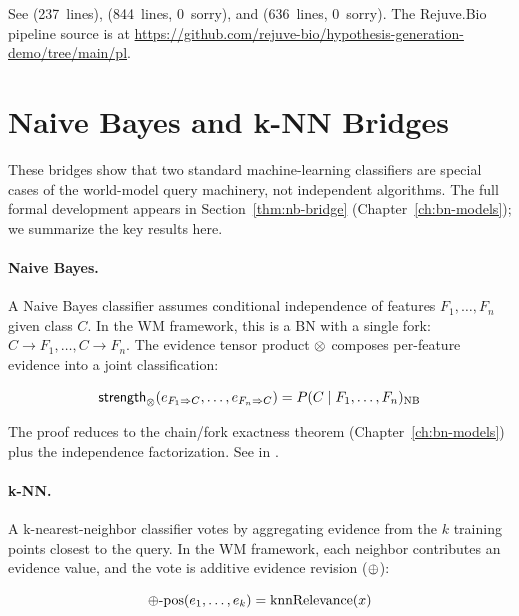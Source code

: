 \documentclass[11pt,openany]{report}
\begin{document}
See  (237~lines),
 (844~lines, 0~sorry),
and  (636~lines,
0~sorry).  The Rejuve.Bio pipeline source is at
\url{https://github.com/rejuve-bio/hypothesis-generation-demo/tree/main/pl}.


\section{Naive Bayes and k-NN Bridges}
\label{sec:nb-knn-bridge}

These bridges show that two standard machine-learning classifiers are
special cases of the world-model query machinery, not independent
algorithms.  The full formal development appears in
Section~\ref{thm:nb-bridge} (Chapter~\ref{ch:bn-models}); we
summarize the key results here.

\paragraph{Naive Bayes.}
A Naive Bayes classifier assumes conditional independence of features
$F_1, \ldots, F_n$ given class $C$.  In the WM framework, this is a
BN with a single fork: $C \to F_1, \ldots, C \to F_n$.  The evidence
tensor product $\otimes$ composes per-feature evidence into a joint
classification:

\begin{theorem}
\[
  \mathsf{strength}_{\otimes}(e_{F_1 \Rightarrow C}, \ldots, e_{F_n \Rightarrow C})
  = P(C \mid F_1, \ldots, F_n)_{\mathrm{NB}}
\]
\end{theorem}

\noindent
The proof reduces to the chain/fork exactness theorem
(Chapter~\ref{ch:bn-models}) plus the independence factorization.
See  in
.

\paragraph{k-NN.}
A k-nearest-neighbor classifier votes by aggregating evidence from
the $k$ training points closest to the query.  In the WM framework,
each neighbor contributes an evidence value, and the vote is additive
evidence revision ($\oplus$):

\begin{theorem}
\[
  \oplus\text{-}\mathrm{pos}(e_1, \ldots, e_k)
  = \mathrm{knnRelevance}(x)
\]
\end{theorem}
\end{document}
